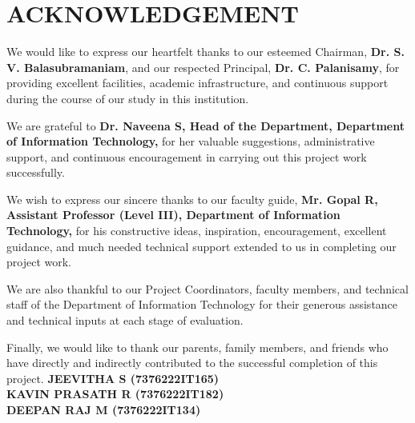 \documentclass[12pt,a4paper]{report}
\begin{document}
\chapter*{ACKNOWLEDGEMENT} \label{chap:ack}
\thispagestyle{plain}
\vspace{0.2cm}
We would like to express our heartfelt thanks to our esteemed Chairman, \textbf{Dr. S. V. Balasubramaniam}, and our respected Principal, \textbf{Dr. C. Palanisamy}, for providing excellent facilities, academic infrastructure, and continuous support during the course of our study in this institution.

We are grateful to \textbf{Dr. Naveena S, Head of the Department, Department of Information Technology,} for her valuable suggestions, administrative support, and continuous encouragement in carrying out this project work successfully.

We wish to express our sincere thanks to our faculty guide, \textbf{Mr. Gopal R, Assistant Professor (Level III), Department of Information Technology,} for his constructive ideas, inspiration, encouragement, excellent guidance, and much needed technical support extended to us in completing our project work.

We are also thankful to our Project Coordinators, faculty members, and technical staff of the Department of Information Technology for their generous assistance and technical inputs at each stage of evaluation.

Finally, we would like to thank our parents, family members, and friends who have directly and indirectly contributed to the successful completion of this project.
\vfill
\noindent
\textbf{JEEVITHA S (7376222IT165)}\\[3pt]
\textbf{KAVIN PRASATH R (7376222IT182)}\\[3pt]
\textbf{DEEPAN RAJ M (7376222IT134)}
\clearpage

\end{document}
